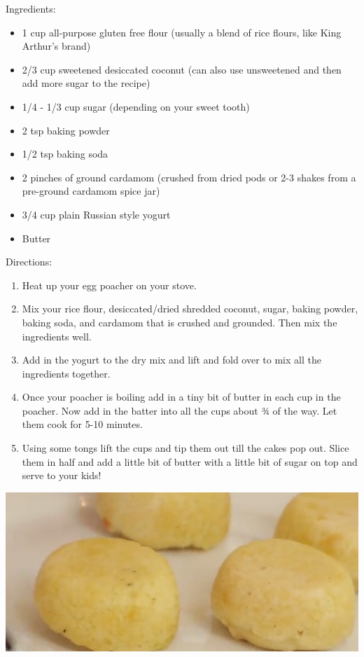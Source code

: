 \documentclass{article}
\begin{document}
%
%
%
%
%

\begin{multicols}{2}
Ingredients:
\begin{itemize}
\item 1 cup all-purpose gluten free flour (usually a blend of rice flours, like King Arthur's brand)
\item 2/3 cup sweetened desiccated coconut (can also use unsweetened and then add more sugar to the recipe)
\item 1/4 - 1/3 cup sugar (depending on your sweet tooth)
\item 2 tsp baking powder
\item 1/2 tsp baking soda
\item 2 pinches of ground cardamom (crushed from dried pods or 2-3 shakes from a pre-ground cardamom spice jar)
\item 3/4 cup plain Russian style yogurt
\item Butter
\end{itemize}



\columnbreak

Directions:
\begin{enumerate}
\item Heat up your egg poacher on your stove.

\item Mix your rice flour, desiccated/dried shredded coconut, sugar, baking powder, baking soda, and cardamom that is crushed and grounded. Then mix the ingredients well.

\item Add in the yogurt to the dry mix and lift and fold over to mix all the ingredients together.

\item Once your poacher is boiling add in a tiny bit of butter in each cup in the poacher. Now add in the batter into all the cups about ¾ of the way. Let them cook for 5-10 minutes.

\item Using some tongs lift the cups and tip them out till the cakes pop out. Slice them in half and add a little bit of butter with a little bit of sugar on top and serve to your kids!

\end{enumerate}
\end{multicols}



\begin{center}
\includegraphics[scale=0.4]{IndianRiceCakes.png}
\end{center}
\end{document}
